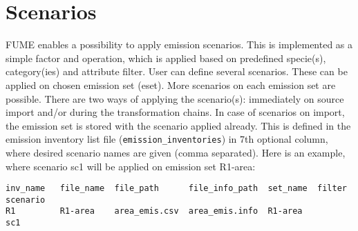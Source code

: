 \documentclass[a4paper,11pt]{article}
\begin{document}
\section{Scenarios}\label{scenario}
FUME enables a possibility to apply emission scenarios. This is implemented as a simple factor and operation, which is applied based on predefined specie(s), category(ies) and attribute filter.  User can define several scenarios. These can be applied on chosen emission set (eset). More scenarios on each emission set are possible. There are two ways of applying the scenario(s): immediately on source import and/or during the transformation chains. In case of scenarios on import, the emission set is stored with the scenario applied already. This is defined in the emission inventory list file (\verb|emission_inventories|) in 7th optional column, where desired scenario names are given (comma separated). Here is an example, where scenario sc1 will be applied on emission set R1-area:
\begin{verbatim}
inv_name   file_name  file_path      file_info_path  set_name  filter  scenario
R1         R1-area    area_emis.csv  area_emis.info  R1-area           sc1
\end{verbatim}
\end{document}
